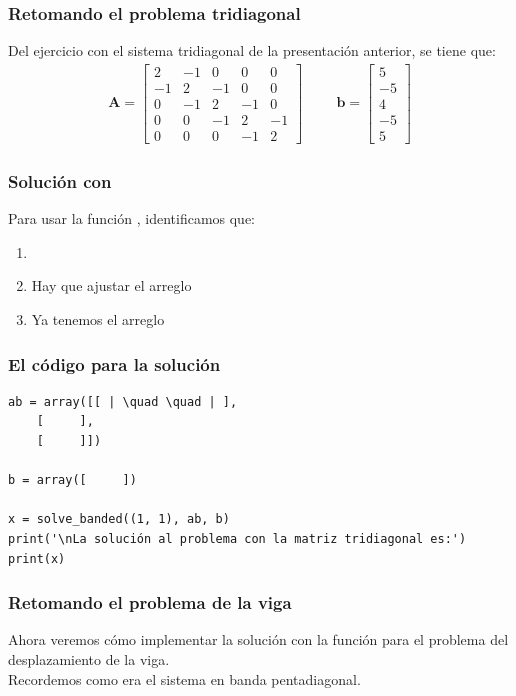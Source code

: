\documentclass[12pt]{beamer}
\begin{document}
\begin{frame}
\frametitle{Retomando el problema tridiagonal}
Del ejercicio con el sistema tridiagonal de la presentación anterior, se tiene que:
\pause
\renewcommand{\arraystretch}{0.9}
\begin{align*}
\mathbf{A} =  \begin{bmatrix}
2 & -1 & 0 & 0 & 0 \\
-1 & 2 & -1 & 0 & 0 \\
0 & -1 & 2 & -1 & 0 \\
0 & 0 & -1 & 2 & -1 \\
0 & 0 & 0 & -1 & 2
\end{bmatrix}
\hspace{1cm}
\mathbf{b} =
\begin{bmatrix}
5 \\
-5 \\
4 \\
-5 \\
5
\end{bmatrix}
\end{align*}
\end{frame}
\begin{frame}
\frametitle{Solución con }
Para usar la función , identificamos que:
\pause
{}
\begin{enumerate}[<+->]
\item {}
\item Hay que ajustar el arreglo 
\item Ya tenemos el arreglo 
\end{enumerate}
\end{frame}
\begin{frame}
\frametitle{El código para la solución}
\begin{lstlisting}[caption=Código para resolver el sistema tridiagonal]
ab = array([[ | \quad \quad | ],
    [     ],
    [     ]])

b = array([     ])

x = solve_banded((1, 1), ab, b)
print('\nLa solución al problema con la matriz tridiagonal es:')
print(x)
\end{lstlisting}
\end{frame}
\begin{frame}
\frametitle{Retomando el problema de la viga}
Ahora veremos cómo implementar la solución con la función  para el problema del desplazamiento de la viga.
\\
\bigskip
\pause
Recordemos como era el sistema en banda pentadiagonal.
\end{frame}
\end{document}
